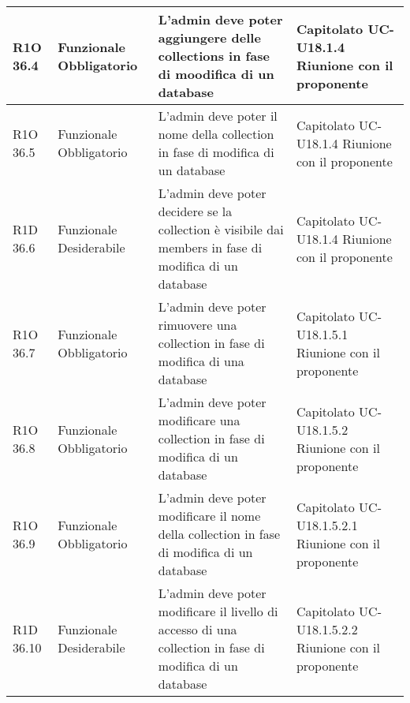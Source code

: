 \begin{center}
\begin{longtable}{ | l | p{2cm} | p{4.7cm} | p{2.5cm} |}
	R1O 36.4 & Funzionale \newline Obbligatorio & L'admin deve poter aggiungere delle collections in fase di moodifica di un database & Capitolato \newline UC-U18.1.4 \newline Riunione con il proponente \\ \hline
	
	R1O 36.5 & Funzionale \newline Obbligatorio & L'admin deve poter il nome della collection in fase di modifica di un database & Capitolato \newline UC-U18.1.4 \newline Riunione con il proponente \\ \hline
	
	R1D 36.6 & Funzionale \newline Desiderabile & L'admin deve poter decidere se la collection è visibile dai members in fase di modifica di un database & Capitolato \newline UC-U18.1.4 \newline Riunione con il proponente \\ \hline
	
	R1O 36.7 & Funzionale \newline Obbligatorio & L'admin deve poter rimuovere una collection in fase di modifica di una database & Capitolato \newline UC-U18.1.5.1 \newline Riunione con il proponente \\ \hline
	
	R1O 36.8 & Funzionale \newline Obbligatorio & L'admin deve poter modificare una collection in fase di modifica di un database & Capitolato \newline UC-U18.1.5.2 \newline Riunione con il proponente \\ \hline
	
	R1O 36.9 & Funzionale \newline Obbligatorio & L'admin deve poter modificare il nome della collection in fase di modifica di un database & Capitolato \newline UC-U18.1.5.2.1 \newline Riunione con il proponente \\ \hline
	
	R1D 36.10 & Funzionale \newline Desiderabile & L'admin deve poter modificare il livello di accesso di una collection in fase di modifica di un database & Capitolato \newline UC-U18.1.5.2.2 \newline Riunione con il proponente \\ \hline
	

\end{longtable}
\end{center}
